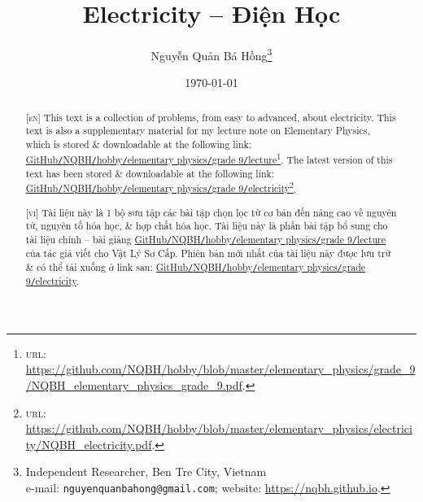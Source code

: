 \documentclass{article}
\title{Electricity -- Điện Học}
\author{Nguyễn Quản Bá Hồng\footnote{Independent Researcher, Ben Tre City, Vietnam\\e-mail: \texttt{nguyenquanbahong@gmail.com}; website: \url{https://nqbh.github.io}.}}
\date{\today}
\begin{document}
\maketitle
\begin{abstract}
	\textsc{[en]} This text is a collection of problems, from easy to advanced, about electricity. This text is also a supplementary material for my lecture note on Elementary Physics, which is stored \& downloadable at the following link: \href{https://github.com/NQBH/hobby/blob/master/elementary_physics/grade_9/NQBH_elementary_physics_grade_9.pdf}{GitHub\texttt{/}NQBH\texttt{/}hobby\texttt{/}elementary physics\texttt{/}grade 9\texttt{/}lecture}\footnote{\textsc{url}: \url{https://github.com/NQBH/hobby/blob/master/elementary_physics/grade_9/NQBH_elementary_physics_grade_9.pdf}.}. The latest version of this text has been stored \& downloadable at the following link:\\\href{https://github.com/NQBH/hobby/blob/master/elementary_physics/electricity/NQBH_electricity.pdf}{GitHub\texttt{/}NQBH\texttt{/}hobby\texttt{/}elementary physics\texttt{/}grade 9\texttt{/}electricity}\footnote{\textsc{url}: \url{https://github.com/NQBH/hobby/blob/master/elementary_physics/electricity/NQBH_electricity.pdf}.}.
	\vspace{2mm}
	
	\textsc{[vi]} Tài liệu này là 1 bộ sưu tập các bài tập chọn lọc từ cơ bản đến nâng cao về nguyên tử, nguyên tố hóa học, \& hợp chất hóa học. Tài liệu này là phần bài tập bổ sung cho tài liệu chính -- bài giảng \href{https://github.com/NQBH/hobby/blob/master/elementary_physics/grade_9/NQBH_elementary_physics_grade_9.pdf}{GitHub\texttt{/}NQBH\texttt{/}hobby\texttt{/}elementary physics\texttt{/}grade 9\texttt{/}lecture} của tác giả viết cho Vật Lý Sơ Cấp. Phiên bản mới nhất của tài liệu này được lưu trữ \& có thể tải xuống ở link sau: \href{https://github.com/NQBH/hobby/blob/master/elementary_physics/grade_9/real/NQBH_real.pdf}{GitHub\texttt{/}NQBH\texttt{/}hobby\texttt{/}elementary physics\texttt{/}grade 9\texttt{/}electricity}.
\end{abstract}
\setcounter{secnumdepth}{4}
\setcounter{tocdepth}{3}
\tableofcontents
\newpage





\printbibliography[heading=bibintoc]
	
\end{document}

